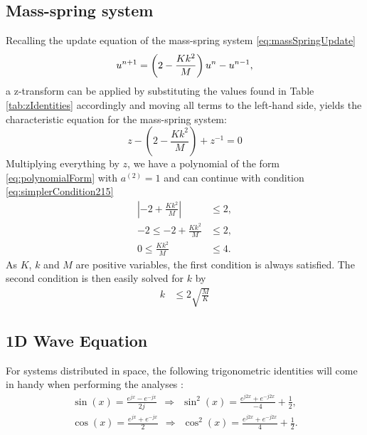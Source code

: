 {{\subsection{Mass-spring system}
Recalling the update equation of the mass-spring system \eqref{eq:massSpringUpdate}
\begin{equation*}
    u^{n+1} = \left(2-\frac{Kk^2}{M} \right)u^n - u^{n-1},
\end{equation*} 
a z-transform can be applied by substituting the values found in Table \ref{tab:zIdentities} accordingly and moving all terms to the left-hand side, yields the characteristic equation for the mass-spring system:
\begin{equation*}
    z - \left(2-\frac{Kk^2}{M} \right) + z^{-1} = 0
\end{equation*}
Multiplying everything by $z$, we have a polynomial of the form \eqref{eq:polynomialForm} with $a^{(2)} = 1$ and can continue with condition \eqref{eq:simplerCondition215}
\begin{align*}
    \left|-2+\frac{Kk^2}{M}\right| &\leq 2,\\
    -2 \leq -2+\frac{Kk^2}{M} &\leq 2,\\
    0 \leq \frac{Kk^2}{M} &\leq 4.
\end{align*}
As $K$, $k$ and $M$ are positive variables, the first condition is always satisfied. The second condition is then easily solved for $k$ by
\begin{align*}
    k &\leq 2\sqrt{\frac{M}{K}}
\end{align*}

\subsection{1D Wave Equation}
For systems distributed in space, the following trigonometric identities will come in handy when performing the analyses \cite[p. 71]{Abramowitz1972}:
\begin{subequations}
    \begin{gather}
        \sin(x) = \frac{e^{jx} - e^{-jx}}{2j}\ \ \Rightarrow \ \ \sin^2(x) %
        = \frac{e^{j2x} + e^{-j2x}}{-4} + \frac{1}{2},\label{eq:sinIdentity}\\
        \cos(x) = \frac{e^{jx} + e^{-jx}}{2}\ \ \Rightarrow \ \ \cos^2(x) %
        = \frac{e^{j2x} + e^{-j2x}}{4} + \frac{1}{2}.\label{eq:cosIdentity}
    \end{gather}
\end{subequations}

}}
